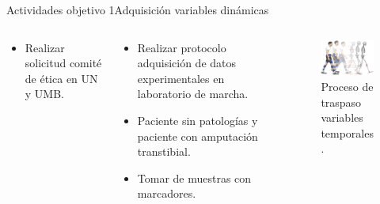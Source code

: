 \documentclass[10pt]{beamer}
\begin{document}
\begin{frame}{Actividades objetivo 1}{Adquisición variables dinámicas}

\begin{columns}[t]


\column{28 mm}
\begin{block}{}

\begin{itemize}
\item {\scriptsize{}Realizar solicitud comité de ética en UN y UMB.}{\scriptsize \par}
\end{itemize}
\end{block}

\column{35 mm}
\begin{block}{}

\begin{itemize}
\item {\scriptsize{}Realizar protocolo adquisición de datos experimentales
en laboratorio de marcha.}{\scriptsize \par}
\item {\scriptsize{}Paciente sin patologías y paciente con amputación transtibial.}{\scriptsize \par}
\item {\scriptsize{}Tomar de muestras con marcadores.}{\scriptsize \par}
\end{itemize}
\end{block}

\column{55 mm}
\begin{block}{}
\begin{figure}
\begin{center}
\includegraphics[scale=0.45]{Feathergraphics/labToModel}
\caption{\scriptsize{Proceso de traspaso variables temporales \cite{Seth2011}.}}
\end{center}
\end{figure}

\end{block}
\end{columns}

\end{frame}
\end{document}
